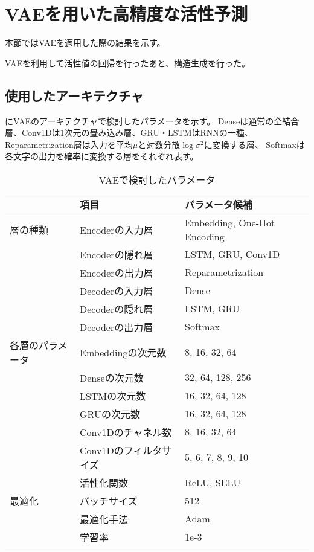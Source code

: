\section{VAEを用いた高精度な活性予測} \label{sec:result_vae}

本節ではVAEを適用した際の結果を示す。

VAEを利用して活性値の回帰を行ったあと、構造生成を行った。

\subsection{使用したアーキテクチャ}

にVAEのアーキテクチャで検討したパラメータを示す。
Denseは通常の全結合層、Conv1Dは1次元の畳み込み層、GRU・LSTMはRNNの一種、
Reparametrization層は入力を平均$\mu$と対数分散$\log\sigma^2$に変換する層、
Softmaxは各文字の出力を確率に変換する層をそれぞれ表す。
\begin{table}[tbp]
    \centering
\caption{VAEで検討したパラメータ} \label{tb:vae_parameter_search}
\begin{tabular}{lll}\hline
& 項目 & パラメータ候補 \\\hline
層の種類 & Encoderの入力層 & Embedding, One-Hot Encoding \\
& Encoderの隠れ層 & LSTM, GRU, Conv1D \\
& Encoderの出力層 & Reparametrization \\
& Decoderの入力層 & Dense \\
& Decoderの隠れ層 & LSTM, GRU \\
& Decoderの出力層 & Softmax \\\hline
各層のパラメータ & Embeddingの次元数 & 8, 16, 32, 64 \\
& Denseの次元数 & 32, 64, 128, 256 \\
& LSTMの次元数 & 16, 32, 64, 128 \\
& GRUの次元数 & 16, 32, 64, 128 \\
& Conv1Dのチャネル数 & 8, 16, 32, 64 \\
& Conv1Dのフィルタサイズ & 5, 6, 7, 8, 9, 10 \\
& 活性化関数 & ReLU, SELU \\\hline
最適化 & バッチサイズ & 512 \\
& 最適化手法 & Adam \\
& 学習率 & 1e-3 \\\hline
\end{tabular}
\end{table}

